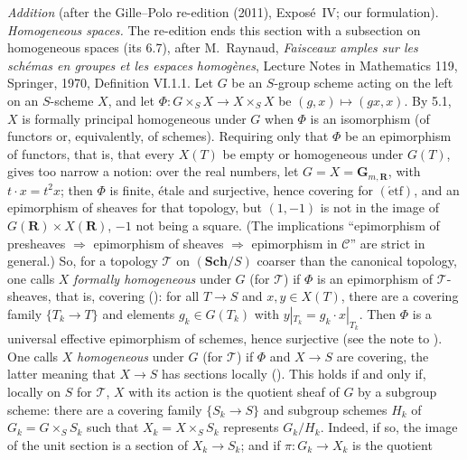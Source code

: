 \par\medskip\noindent
{}\emph{Addition} (after the Gille--Polo re-edition (2011), Expos\'e~IV; our
formulation).  \emph{Homogeneous spaces.} The re-edition
ends this section with a subsection on homogeneous spaces (its 6.7), after
M.~Raynaud, \emph{Faisceaux amples sur les sch\'emas en groupes et les espaces
homog\`enes}, Lecture Notes in Mathematics 119, Springer, 1970, Definition
VI.1.1. Let \(G\) be an \(S\)-group scheme acting on the left on an
\(S\)-scheme \(X\), and let \(\Phi\colon G\times_SX\to X\times_SX\) be
\((g,x)\mapsto(gx,x)\). By 5.1, \(X\) is formally principal homogeneous under
\(G\) when \(\Phi\) is an isomorphism (of functors or, equivalently, of
schemes). Requiring only that \(\Phi\) be an epimorphism of functors, that is,
that every \(X(T)\) be empty or homogeneous under \(G(T)\), gives too narrow a
notion: over the real numbers, let \(G=X=\mathbf G_{m,\mathbf R}\), with
\(t\cdot x=t^2x\); then \(\Phi\) is finite, \'etale and surjective, hence
covering for \((\mathrm{\acute etf})\), and an epimorphism of sheaves for that
topology, but \((1,-1)\) is not in the image of
\(G(\mathbf R)\times X(\mathbf R)\), \(-1\) not being a square. (The
implications ``epimorphism of presheaves \(\Rightarrow\) epimorphism of sheaves
\(\Rightarrow\) epimorphism in \(\mathscr C\)'' are strict in general.) So, for
a topology \(\mathcal T\) on \((\mathbf{Sch}/S)\) coarser than the canonical
topology, one calls \(X\) \emph{formally homogeneous} under \(G\) (for
\(\mathcal T\)) if \(\Phi\) is an epimorphism of \(\mathcal T\)-sheaves, that
is, covering (): for all \(T\to S\) and \(x,y\in X(T)\), there are a
covering family \(\{T_k\to T\}\) and elements \(g_k\in G(T_k)\) with
\(y|_{T_k}=g_k\cdot x|_{T_k}\). Then \(\Phi\) is a universal effective
epimorphism of schemes, hence surjective (see the note to ). One calls
\(X\) \emph{homogeneous} under \(G\) (for \(\mathcal T\)) if \(\Phi\) and
\(X\to S\) are covering, the latter meaning that \(X\to S\) has sections
locally (). This holds if and only if, locally on \(S\) for
\(\mathcal T\), \(X\) with its action is the quotient sheaf of \(G\) by a
subgroup scheme: there are a covering family \(\{S_k\to S\}\) and subgroup
schemes \(H_k\) of \(G_k=G\times_SS_k\) such that \(X_k=X\times_SS_k\)
represents \(G_k/H_k\). Indeed, if so, the image of the unit section is a
section of \(X_k\to S_k\); and if \(\pi\colon G_k\to X_k\) is the quotient
